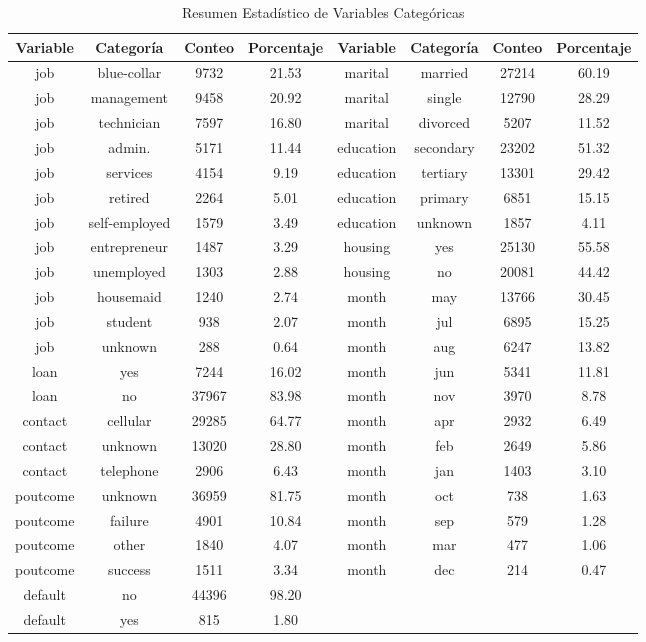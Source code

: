 \documentclass[10pt]{article}
\begin{document}
\begin{table}[h!]
\centering
\caption{Resumen Estadístico de Variables Categóricas}
\label{tab:resumen_categoricas}
\begin{tabular}{cccc|cccc}
\toprule
\textbf{Variable} & \textbf{Categoría} & \textbf{Conteo} & \textbf{Porcentaje} &\textbf{Variable} & \textbf{Categoría} & \textbf{Conteo} & \textbf{Porcentaje} \\
\midrule
job & blue-collar   & 9732  & 21.53 & marital & married   & 27214 & 60.19 \\
job & management    & 9458  & 20.92 & marital & single    & 12790 & 28.29 \\
job & technician    & 7597  & 16.80 & marital & divorced  &  5207 & 11.52 \\
job & admin.        & 5171  & 11.44 & education & secondary & 23202 & 51.32 \\
job & services      & 4154  &  9.19 & education & tertiary  & 13301 & 29.42 \\
job & retired       & 2264  &  5.01 & education & primary   &  6851 & 15.15 \\
job & self-employed & 1579  &  3.49 & education & unknown   &  1857 &  4.11 \\
job & entrepreneur  & 1487  &  3.29 & housing & yes        & 25130 & 55.58 \\
job & unemployed    & 1303  &  2.88 & housing & no         & 20081 & 44.42 \\
job & housemaid     & 1240  &  2.74 & month   & may        & 13766 & 30.45\\
job & student       &  938  &  2.07 & month   & jul        &  6895 & 15.25\\
job & unknown       &  288  &  0.64 & month   & aug        &  6247 & 13.82\\
loan   & yes        &  7244 & 16.02 & month   & jun        &  5341 & 11.81\\
loan   & no         & 37967 & 83.98 & month   & nov        &  3970 &  8.78\\    
contact & cellular   & 29285 & 64.77 &month   & apr        &  2932 &  6.49  \\
contact & unknown    & 13020 & 28.80 &month   & feb        &  2649 &  5.86  \\
contact & telephone  &  2906 &  6.43 &month   & jan        &  1403 &  3.10  \\
poutcome & unknown   & 36959 & 81.75 &month   & oct        &   738 &  1.63  \\
poutcome & failure   &  4901 & 10.84 &month   & sep        &   579 &  1.28  \\
poutcome & other     &  1840 &  4.07 &month   & mar        &   477 &  1.06  \\
poutcome & success   &  1511 &  3.34 &month   & dec        &   214 &  0.47  \\
default & no         & 44396 & 98.20 &        &            &       &    \\
default & yes        &   815 &  1.80 &        &            &       &     \\
\bottomrule
\end{tabular}
\end{table}
\end{document}
